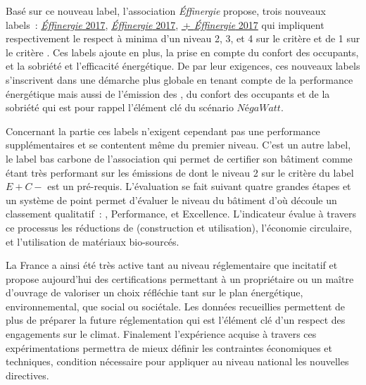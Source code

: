 Basé sur ce nouveau label, l’association \textit{Éffinergie} propose, trois nouveaux labels~:
\href{https://www.effinergie.org/web/index.php/les-labels-effinergie/le-label-bbc-effinergie-2017}{ \textit{Éffinergie} 2017},
\href{https://www.effinergie.org/web/index.php/les-labels-effinergie/le-label-bepos-bepos-effinergie-2017}{ \textit{Éffinergie} 2017},
\href{https://www.effinergie.org/web/index.php/les-labels-effinergie/le-label-bepos-bepos-effinergie-2017}{\,+ \textit{Éffinergie} 2017}
qui impliquent respectivement le respect à minima d’un niveau 2, 3, et 4 sur le critère  et
de 1 sur le critère . Ces labels ajoute en plus, la prise en compte du confort des occupants, et la sobriété
et l’efficacité énergétique. De par leur exigences, ces nouveaux labels s’inscrivent dans une
démarche plus globale en tenant compte de la performance énergétique mais aussi de l’émission
des , du confort des occupants et de la sobriété qui est pour rappel l’élément clé
du scénario $NégaWatt$.

Concernant la partie  ces labels n’exigent cependant pas une performance supplémentaires
et se contentent même du premier niveau. C’est un autre label, le label bas carbone de l’association
\href{http://www.certivea.fr/offres/label-bbca-batiment-bas-carbone}{} qui permet de
certifier son bâtiment comme étant très performant sur les émissions de 
dont le niveau 2 sur le critère  du label $E+C-$ est un pré-requis. L’évaluation
se fait suivant quatre grandes étapes et un système de point permet d’évaluer le niveau
du bâtiment d’où découle un classement qualitatif~: ,  Performance, et  Excellence.
L’indicateur évalue à travers ce processus les réductions de  (construction et utilisation),
l’économie circulaire, et l’utilisation de matériaux bio-sourcés.

La France a ainsi été très active tant au niveau réglementaire que incitatif et propose
aujourd’hui des certifications permettant à un propriétaire ou un maître d’ouvrage
de valoriser un choix réfléchie tant sur le plan énergétique, environnemental, que
social ou sociétale. Les données recueillies permettent de plus de préparer la future réglementation
qui est l’élément clé d’un respect des engagements sur le climat. Finalement l’expérience
acquise à travers ces expérimentations permettra de mieux définir les contraintes
économiques et techniques, condition nécessaire pour appliquer au niveau national les nouvelles
directives.


